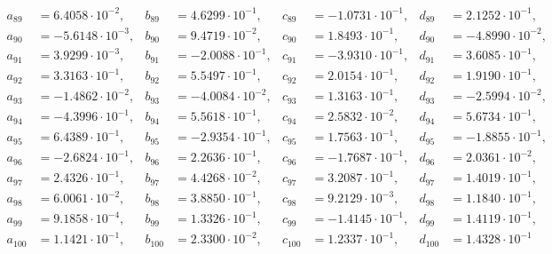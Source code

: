 \begin{align*}
  a_{ 89 } &= 6.4058 \cdot 10^{ -2 }, & b_{ 89 } &= 4.6299 \cdot 10^{ -1 }, & c_{ 89 } &= -1.0731 \cdot 10^{ -1 }, & d_{ 89 } &= 2.1252 \cdot 10^{ -1 }, \\ 
  a_{ 90 } &= -5.6148 \cdot 10^{ -3 }, & b_{ 90 } &= 9.4719 \cdot 10^{ -2 }, & c_{ 90 } &= 1.8493 \cdot 10^{ -1 }, & d_{ 90 } &= -4.8990 \cdot 10^{ -2 }, \\ 
  a_{ 91 } &= 3.9299 \cdot 10^{ -3 }, & b_{ 91 } &= -2.0088 \cdot 10^{ -1 }, & c_{ 91 } &= -3.9310 \cdot 10^{ -1 }, & d_{ 91 } &= 3.6085 \cdot 10^{ -1 }, \\ 
  a_{ 92 } &= 3.3163 \cdot 10^{ -1 }, & b_{ 92 } &= 5.5497 \cdot 10^{ -1 }, & c_{ 92 } &= 2.0154 \cdot 10^{ -1 }, & d_{ 92 } &= 1.9190 \cdot 10^{ -1 }, \\ 
  a_{ 93 } &= -1.4862 \cdot 10^{ -2 }, & b_{ 93 } &= -4.0084 \cdot 10^{ -2 }, & c_{ 93 } &= 1.3163 \cdot 10^{ -1 }, & d_{ 93 } &= -2.5994 \cdot 10^{ -2 }, \\ 
  a_{ 94 } &= -4.3996 \cdot 10^{ -1 }, & b_{ 94 } &= 5.5618 \cdot 10^{ -1 }, & c_{ 94 } &= 2.5832 \cdot 10^{ -2 }, & d_{ 94 } &= 5.6734 \cdot 10^{ -1 }, \\ 
  a_{ 95 } &= 6.4389 \cdot 10^{ -1 }, & b_{ 95 } &= -2.9354 \cdot 10^{ -1 }, & c_{ 95 } &= 1.7563 \cdot 10^{ -1 }, & d_{ 95 } &= -1.8855 \cdot 10^{ -1 }, \\ 
  a_{ 96 } &= -2.6824 \cdot 10^{ -1 }, & b_{ 96 } &= 2.2636 \cdot 10^{ -1 }, & c_{ 96 } &= -1.7687 \cdot 10^{ -1 }, & d_{ 96 } &= 2.0361 \cdot 10^{ -2 }, \\ 
  a_{ 97 } &= 2.4326 \cdot 10^{ -1 }, & b_{ 97 } &= 4.4268 \cdot 10^{ -2 }, & c_{ 97 } &= 3.2087 \cdot 10^{ -1 }, & d_{ 97 } &= 1.4019 \cdot 10^{ -1 }, \\ 
  a_{ 98 } &= 6.0061 \cdot 10^{ -2 }, & b_{ 98 } &= 3.8850 \cdot 10^{ -1 }, & c_{ 98 } &= 9.2129 \cdot 10^{ -3 }, & d_{ 98 } &= 1.1840 \cdot 10^{ -1 }, \\ 
  a_{ 99 } &= 9.1858 \cdot 10^{ -4 }, & b_{ 99 } &= 1.3326 \cdot 10^{ -1 }, & c_{ 99 } &= -1.4145 \cdot 10^{ -1 }, & d_{ 99 } &= 1.4119 \cdot 10^{ -1 }, \\ 
  a_{ 100 } &= 1.1421 \cdot 10^{ -1 }, & b_{ 100 } &= 2.3300 \cdot 10^{ -2 }, & c_{ 100 } &= 1.2337 \cdot 10^{ -1 }, & d_{ 100 } &= 1.4328 \cdot 10^{ -1 }
\end{align*}
